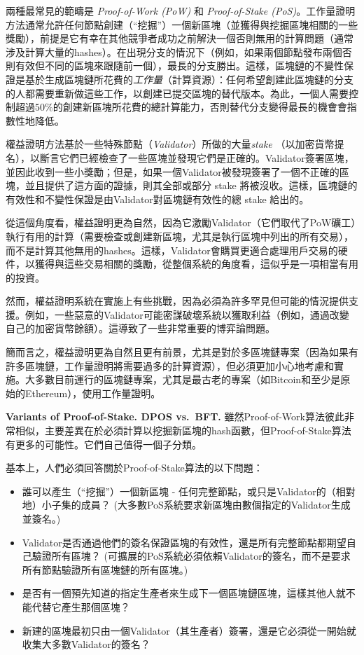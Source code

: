 \documentclass[12pt,oneside]{article}
\def\makepoint#1{\medbreak\noindent{\bf #1.\ }}
\def\nxsubpoint{\refstepcounter{subsubsection}%
  \smallbreak\makepoint{\thesubsubsection}}
\def\embt(#1.){\textbf{#1.}}
\begin{document}
兩種最常見的範疇是 {\em Proof-of-Work (PoW)} 和 {\em Proof-of-Stake (PoS)}。工作量證明方法通常允許任何節點創建（“挖掘”）一個新區塊（並獲得與挖掘區塊相關的一些獎勵），前提是它有幸在其他競爭者成功之前解決一個否則無用的計算問題（通常涉及計算大量的hashes）。在出現分支的情況下（例如，如果兩個節點發布兩個否則有效但不同的區塊來跟隨前一個），最長的分支勝出。這樣，區塊鏈的不變性保證是基於生成區塊鏈所花費的{\em 工作量}（計算資源）：任何希望創建此區塊鏈的分支的人都需要重新做這些工作，以創建已提交區塊的替代版本。為此，一個人需要控制超過$50\%$的創建新區塊所花費的總計算能力，否則替代分支變得最長的機會會指數性地降低。

權益證明方法基於一些特殊節點（{\em Validator}）所做的大量{\em  stake }（以加密貨幣提名），以斷言它們已經檢查了一些區塊並發現它們是正確的。Validator簽署區塊，並因此收到一些小獎勵；但是，如果一個Validator被發現簽署了一個不正確的區塊，並且提供了這方面的證據，則其全部或部分 stake 將被沒收。這樣，區塊鏈的有效性和不變性保證是由Validator對區塊鏈有效性的總 stake 給出的。

從這個角度看，權益證明更為自然，因為它激勵Validator（它們取代了PoW礦工）執行有用的計算（需要檢查或創建新區塊，尤其是執行區塊中列出的所有交易），而不是計算其他無用的hashes。這樣，Validator會購買更適合處理用戶交易的硬件，以獲得與這些交易相關的獎勵，從整個系統的角度看，這似乎是一項相當有用的投資。

然而，權益證明系統在實施上有些挑戰，因為必須為許多罕見但可能的情況提供支援。例如，一些惡意的Validator可能密謀破壞系統以獲取利益（例如，通過改變自己的加密貨幣餘額）。這導致了一些非常重要的博弈論問題。

簡而言之，權益證明更為自然且更有前景，尤其是對於多區塊鏈專案（因為如果有許多區塊鏈，工作量證明將需要過多的計算資源），但必須更加小心地考慮和實施。大多數目前運行的區塊鏈專案，尤其是最古老的專案（如Bitcoin和至少是原始的Ethereum），使用工作量證明。

\nxsubpoint\label{sp:dpos.bft} \embt(Variants of Proof-of-Stake. DPOS
vs.\ BFT.) 雖然Proof-of-Work算法彼此非常相似，主要差異在於必須計算以挖掘新區塊的hash函數，但Proof-of-Stake算法有更多的可能性。它們自己值得一個子分類。

基本上，人們必須回答關於Proof-of-Stake算法的以下問題：
\begin{itemize}
\item 誰可以產生（“挖掘”）一個新區塊 - 任何完整節點，或只是Validator的（相對地）小子集的成員？ (大多數PoS系統要求新區塊由數個指定的Validator生成並簽名。)
\item Validator是否通過他們的簽名保證區塊的有效性，還是所有完整節點都期望自己驗證所有區塊？ (可擴展的PoS系統必須依賴Validator的簽名，而不是要求所有節點驗證所有區塊鏈的所有區塊。)
\item 是否有一個預先知道的指定生產者來生成下一個區塊鏈區塊，這樣其他人就不能代替它產生那個區塊？
\item 新建的區塊最初只由一個Validator（其生產者）簽署，還是它必須從一開始就收集大多數Validator的簽名？
\end{itemize}
\end{document}
